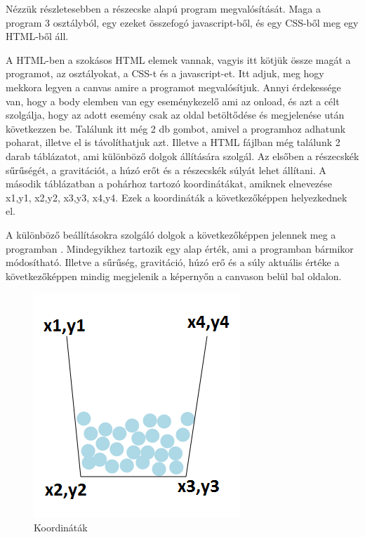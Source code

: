 


Nézzük részletesebben a részecske alapú program megvalósítását. Maga a program 3 osztályból, egy ezeket összefogó javascript-ből, és egy CSS-ből meg egy HTML-ből áll. 


 A HTML-ben a szokásos HTML elemek vannak, vagyis itt kötjük össze magát a programot, az osztályokat, a CSS-t és a javascript-et. Itt adjuk, meg hogy mekkora legyen a canvas amire a programot megvalósítjuk. Annyi érdekessége van, hogy a body elemben van egy eseménykezelő ami az onload, és azt a célt szolgálja, hogy az adott esemény csak az oldal betöltődése és megjelenése után következzen be.
Találunk itt még 2 db gombot, amivel a programhoz adhatunk poharat, illetve el is távolíthatjuk azt.
Illetve a HTML fájlban még találunk 2 darab táblázatot, ami különböző dolgok állítására szolgál. Az elsőben a részecskék sűrűségét, a gravitációt, a húzó erőt és a részecskék súlyát lehet állítani. 
A második táblázatban a pohárhoz tartozó koordinátákat, amiknek elnevezése x1,y1, x2,y2, x3,y3, x4,y4. Ezek a koordináták a következőképpen  helyezkednek el.

A különböző beállításokra szolgáló dolgok a következőképpen jelennek meg a programban . Mindegyikhez tartozik egy alap érték, ami a programban bármikor módosítható. Illetve a sűrűség, gravitáció, húzó erő és a súly aktuális értéke a következőképpen  mindig megjelenik a képernyőn a canvason belül bal oldalon. 

\begin{figure}[h]
	\centering
	\includegraphics[scale=1]{images/pohar.png}
	\caption{Koordináták}
	\label{fig:pohar}
\end{figure}

